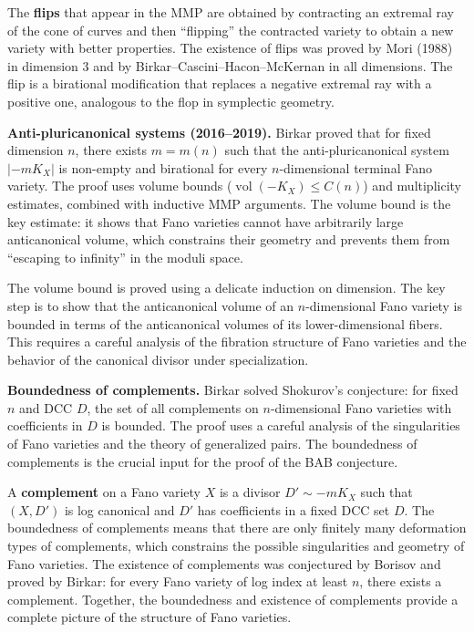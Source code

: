 The \textbf{flips} that appear in the MMP are obtained by contracting an extremal ray of the cone of curves and then ``flipping'' the contracted variety to obtain a new variety with better properties. The existence of flips was proved by Mori (1988) in dimension 3 and by Birkar--Cascini--Hacon--McKernan in all dimensions. The flip is a birational modification that replaces a negative extremal ray with a positive one, analogous to the flop in symplectic geometry.

\textbf{Anti-pluricanonical systems (2016--2019).} Birkar proved that for fixed dimension $n$, there exists $m = m(n)$ such that the anti-pluricanonical system $|-mK_X|$ is non-empty and birational for every $n$-dimensional terminal Fano variety. The proof uses volume bounds ($\operatorname{vol}(-K_X) \le C(n)$) and multiplicity estimates, combined with inductive MMP arguments. The volume bound is the key estimate: it shows that Fano varieties cannot have arbitrarily large anticanonical volume, which constrains their geometry and prevents them from ``escaping to infinity'' in the moduli space.

The volume bound is proved using a delicate induction on dimension. The key step is to show that the anticanonical volume of an $n$-dimensional Fano variety is bounded in terms of the anticanonical volumes of its lower-dimensional fibers. This requires a careful analysis of the fibration structure of Fano varieties and the behavior of the canonical divisor under specialization.

\textbf{Boundedness of complements.} Birkar solved Shokurov's conjecture: for fixed $n$ and DCC $D$, the set of all complements on $n$-dimensional Fano varieties with coefficients in $D$ is bounded. The proof uses a careful analysis of the singularities of Fano varieties and the theory of generalized pairs. The boundedness of complements is the crucial input for the proof of the BAB conjecture.

A \textbf{complement} on a Fano variety $X$ is a divisor $D' \sim -mK_X$ such that $(X, D')$ is log canonical and $D'$ has coefficients in a fixed DCC set $D$. The boundedness of complements means that there are only finitely many deformation types of complements, which constrains the possible singularities and geometry of Fano varieties. The existence of complements was conjectured by Borisov and proved by Birkar: for every Fano variety of log index at least $n$, there exists a complement. Together, the boundedness and existence of complements provide a complete picture of the structure of Fano varieties.

